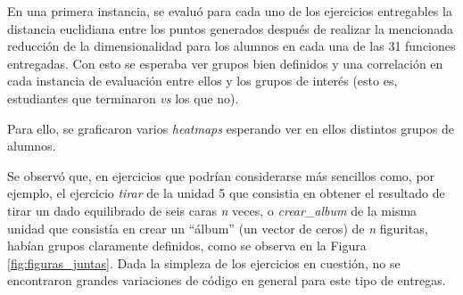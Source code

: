 \documentclass[11pt,a4paper,twoside,openany]{tesis}
\begin{document}
En una primera instancia, se evaluó para cada uno de los ejercicios entregables la distancia euclidiana entre los puntos generados después de realizar la mencionada reducción de la dimensionalidad para los alumnos en cada una de las 31 funciones entregadas. Con esto se esperaba ver grupos bien definidos y una correlación en cada instancia de evaluación entre ellos y los grupos de interés (esto es, estudiantes que terminaron \emph{vs} los que no). 

Para ello, se graficaron varios \emph{heatmaps} esperando ver en ellos distintos grupos de alumnos. 

Se observó que, en ejercicios que podrían considerarse más sencillos como, por ejemplo, el ejercicio \emph{tirar} de la unidad 5 que consistia en obtener el resultado de tirar un dado equilibrado de seis caras \emph{n} veces, o \emph{crear\_album} de la misma unidad que consistía en crear un ``álbum'' (un vector de ceros) de \emph{n} figuritas, habían grupos claramente definidos, como se observa en la Figura \ref{fig:figuras_juntas}. Dada la simpleza de los ejercicios en cuestión, no se encontraron grandes variaciones de código en general para este tipo de entregas. 
\end{document}

